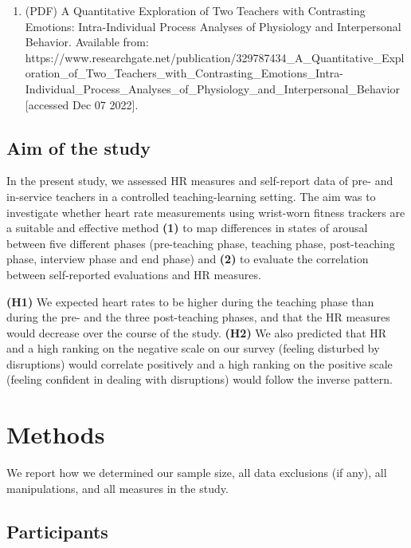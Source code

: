 \documentclass[]{elsarticle} %
\providecommand{\tightlist}{%
  \setlength{\itemsep}{0pt}\setlength{\parskip}{0pt}}
\begin{document}
\begin{enumerate}
\def\labelenumi{(\arabic{enumi})}
\setcounter{enumi}{19}
\tightlist
\item
  (PDF) A Quantitative Exploration of Two Teachers with Contrasting
  Emotions: Intra-Individual Process Analyses of Physiology and
  Interpersonal Behavior. Available from:
  https://www.researchgate.net/publication/329787434\_A\_Quantitative\_Exploration\_of\_Two\_Teachers\_with\_Contrasting\_Emotions\_Intra-Individual\_Process\_Analyses\_of\_Physiology\_and\_Interpersonal\_Behavior
  {[}accessed Dec 07 2022{]}.
\end{enumerate}

\hypertarget{aim-of-the-study}{%
\subsection{Aim of the study}\label{aim-of-the-study}}

In the present study, we assessed HR measures and self-report data of
pre- and in-service teachers in a controlled teaching-learning setting.
The aim was to investigate whether heart rate measurements using
wrist-worn fitness trackers are a suitable and effective method
\textbf{(1)} to map differences in states of arousal between five
different phases (pre-teaching phase, teaching phase, post-teaching
phase, interview phase and end phase) and \textbf{(2)} to evaluate the
correlation between self-reported evaluations and HR measures.

\textbf{(H1)} We expected heart rates to be higher during the teaching
phase than during the pre- and the three post-teaching phases, and that
the HR measures would decrease over the course of the study.
\textbf{(H2)} We also predicted that HR and a high ranking on the
negative scale on our survey (feeling disturbed by disruptions) would
correlate positively and a high ranking on the positive scale (feeling
confident in dealing with disruptions) would follow the inverse pattern.

\hypertarget{methods}{%
\section{Methods}\label{methods}}

We report how we determined our sample size, all data exclusions (if
any), all manipulations, and all measures in the study.

\hypertarget{participants}{%
\subsection{Participants}\label{participants}}


\end{document}
